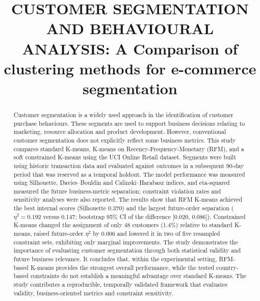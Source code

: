 \documentclass[conference,10pt]{IEEEtran}
\begin{document}
\title{CUSTOMER SEGMENTATION AND
BEHAVIOURAL ANALYSIS: A Comparison of
clustering methods for e-commerce segmentation}

\author{
}

\maketitle

\begin{abstract}
Customer segmentation is a widely used approach
in the identification of customer purchase behaviours. These
segments are used to support business decisions relating to
marketing, resource allocation and product development. However, conventional customer segmentation does not explicitly
reflect some business metrics. This study compares standard
K-means, K-means on Recency-Frequency-Monetary (RFM), and a
soft constrained K-means using the UCI Online Retail dataset.
Segments were built using historic transaction data and evaluated
against outcomes in a subsequent 90-day period that was reserved
as a temporal holdout. The model performance was measured
using Silhouette, Davies–Bouldin and Calinski–Harabasz indices,
and eta-squared measured the future business-metric separation; constraint violation rates and sensitivity analyses were also reported. The
results show that RFM K-means achieved the best internal
scores (Silhouette 0.370) and the largest future-order separation
($\eta^2 = 0.192$ versus 0.147; bootstrap 95\% CI of the difference
[0.020, 0.086]). Constrained K-means changed the assignment
of only 48 customers (1.4\%) relative to standard K-means,
raised future-order $\eta^2$ by 0.006 and lowered it in two of five
resampled constraint sets, exhibiting only marginal improvements.
The study demonstrates the importance of evaluating customer
segmentation through both statistical validity and future business
relevance. It concludes that, within the experimental setting,
RFM-based K-means provides the strongest overall performance,
while the tested country-based constraints do not establish
a meaningful advantage over standard K-means. The study
contributes a reproducible, temporally validated framework that
evaluates validity, business-oriented metrics and constraint
sensitivity.
\end{abstract}
\end{document}
